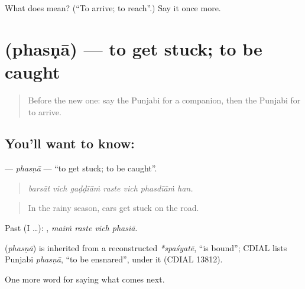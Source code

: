 \begin{tcolorbox}[breakable,colback=teal!4,colframe=teal!35!black,title={Before you move on}]
What does  mean? (\textquotedblleft{}To arrive; to reach\textquotedblright{}.) Say it once more.
\end{tcolorbox}
\section[\texorpdfstring{\pa{ਫਸਣਾ} (phasṇā)}{ਫਸਣਾ (phasṇā)}]{ (phasṇā) — to get stuck; to be caught}

\label{lesson:PA-C283-phasna}



\begin{quote}
Before the new one: say the Punjabi for a companion, then the Punjabi for to arrive.
\end{quote}

\subsection*{You'll want to know: }
\textbf{} — \emph{phasṇā} — \textquotedblleft{}to get stuck; to be caught\textquotedblright{}.

\begin{quote}
      
\end{quote}

\begin{quote}
\emph{barsāt vich gaḍḍīāṁ raste vich phasdīāṁ han.}
\end{quote}

\begin{quote}
In the rainy season, cars get stuck on the road.
\end{quote}

Past (I …):    , \emph{maiṁ raste vich phasiā}.

\begin{cousinweb}
\textbf{} (\emph{phasṇā}) is inherited from a reconstructed \emph{*spaśyatē}, \textquotedblleft{}is bound\textquotedblright{}; CDIAL lists Punjabi \emph{phasṇā}, \textquotedblleft{}to be ensnared\textquotedblright{}, under it (CDIAL 13812).
\end{cousinweb}

\begin{grammarlens}[title={What you've built}]
One more word for saying what comes next.
\end{grammarlens}

